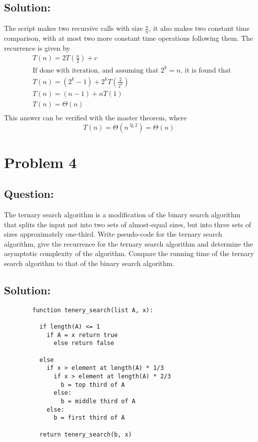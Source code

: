 \documentclass[12pt]{article}
\begin{document}
      \subsection{Solution:}

        The script makes two recursive calls with size $\frac{n}{n}$, it also makes two constant time comparison, with at most two more constant time operations following them. The recurrence is given by 
        \begin{equation}
          \begin{aligned}
            & T(n) = 2T(\frac{n}{2}) + c \\
            & \text{If done with iteration, and assuming that $2^k = n$, it is found that} \\
            & T(n) = (2^k - 1) + 2^kT(\frac{2}{2^k}) \\
            & T(n) = (n - 1) + nT(1) \\
            & T(n) = \Theta(n) \\
          \end{aligned} 
        \end{equation}
        This answer can be verified with the master theorem, where $$T(n) = \Theta(n^{\lg2}) = \Theta(n)$$

\pagebreak
\section{Problem 4}

    \subsection{Question:}
      The ternary search algorithm is a modification of the binary search algorithm that splits the input not into two sets of almost-equal sizes, but into three sets of sizes approximately one-third. Write pseudo-code for the ternary search algorithm, give the recurrence for the ternary search algorithm and determine the asymptotic complexity of the algorithm. Compare the running time of the ternary search algorithm to that of the binary search algorithm.

    \subsection{Solution:}

      \begin{verbatim}
        function tenery_search(list A, x):

          if length(A) <= 1
            if A = x return true
              else return false

          else
            if x > element at length(A) * 1/3 
              if x > element at length(A) * 2/3
                b = top third of A
              else:
                b = middle third of A
            else:
              b = first third of A

          return tenery_search(b, x)
      \end{verbatim}
\end{document}
